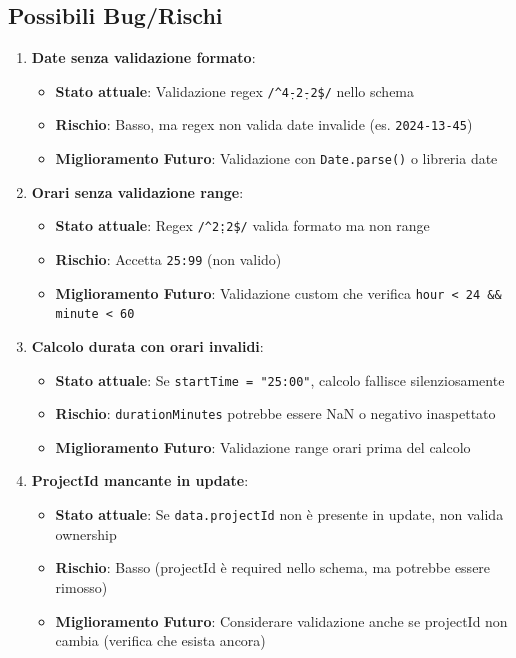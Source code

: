 \documentclass[11pt,a4paper]{article}
\begin{document}
\subsection{Possibili Bug/Rischi}

\begin{enumerate}
    \item \textbf{Date senza validazione formato}:
    \begin{itemize}
        \item \textbf{Stato attuale}: Validazione regex \texttt{/^\d{4}-\d{2}-\d{2}\$/} nello schema
        \item \textbf{Rischio}: Basso, ma regex non valida date invalide (es. \texttt{2024-13-45})
        \item \textbf{Miglioramento Futuro}: Validazione con \texttt{Date.parse()} o libreria date
    \end{itemize}
    
    \item \textbf{Orari senza validazione range}:
    \begin{itemize}
        \item \textbf{Stato attuale}: Regex \texttt{/^\d{2}:\d{2}\$/} valida formato ma non range
        \item \textbf{Rischio}: Accetta \texttt{25:99} (non valido)
        \item \textbf{Miglioramento Futuro}: Validazione custom che verifica \texttt{hour < 24 && minute < 60}
    \end{itemize}
    
    \item \textbf{Calcolo durata con orari invalidi}:
    \begin{itemize}
        \item \textbf{Stato attuale}: Se \texttt{startTime = "25:00"}, calcolo fallisce silenziosamente
        \item \textbf{Rischio}: \texttt{durationMinutes} potrebbe essere NaN o negativo inaspettato
        \item \textbf{Miglioramento Futuro}: Validazione range orari prima del calcolo
    \end{itemize}
    
    \item \textbf{ProjectId mancante in update}:
    \begin{itemize}
        \item \textbf{Stato attuale}: Se \texttt{data.projectId} non è presente in update, non valida ownership
        \item \textbf{Rischio}: Basso (projectId è required nello schema, ma potrebbe essere rimosso)
        \item \textbf{Miglioramento Futuro}: Considerare validazione anche se projectId non cambia (verifica che esista ancora)
    \end{itemize}
    

\end{enumerate}
\end{document}
